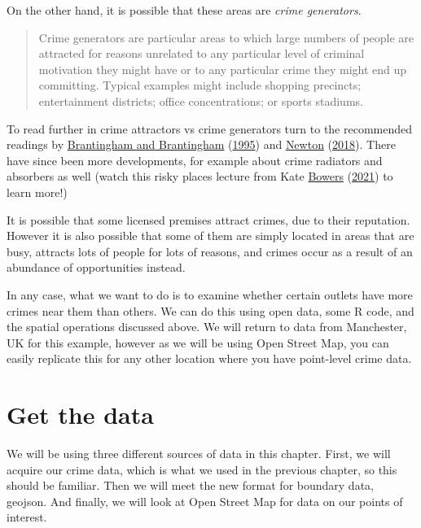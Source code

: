\documentclass[
]{book}
\begin{document}
On the other hand, it is possible that these areas are \emph{crime generators}.

\begin{quote}
Crime generators are particular areas to which large numbers of people are attracted for reasons unrelated to any particular level of criminal motivation they might have or to any particular crime they might end up committing. Typical examples might include shopping precincts; entertainment districts; office concentrations; or sports stadiums.
\end{quote}

To read further in crime attractors vs crime generators turn to the recommended readings by \protect\hyperlink{ref-Brantingham_1995}{Brantingham and Brantingham} (\protect\hyperlink{ref-Brantingham_1995}{1995}) and \protect\hyperlink{ref-Newton_2018}{Newton} (\protect\hyperlink{ref-Newton_2018}{2018}). There have since been more developments, for example about crime radiators and absorbers as well (watch this risky places lecture from Kate \protect\hyperlink{ref-Bowers_2021}{Bowers} (\protect\hyperlink{ref-Bowers_2021}{2021}) to learn more!)

It is possible that some licensed premises attract crimes, due to their reputation. However it is also possible that some of them are simply located in areas that are busy, attracts lots of people for lots of reasons, and crimes occur as a result of an abundance of opportunities instead.

In any case, what we want to do is to examine whether certain outlets have more crimes near them than others. We can do this using open data, some R code, and the spatial operations discussed above. We will return to data from Manchester, UK for this example, however as we will be using Open Street Map, you can easily replicate this for any other location where you have point-level crime data.

\hypertarget{get-the-data}{%
\section{Get the data}\label{get-the-data}}

We will be using three different sources of data in this chapter. First, we will acquire our crime data, which is what we used in the previous chapter, so this should be familiar. Then we will meet the new format for boundary data, geojson. And finally, we will look at Open Street Map for data on our points of interest.
\end{document}
